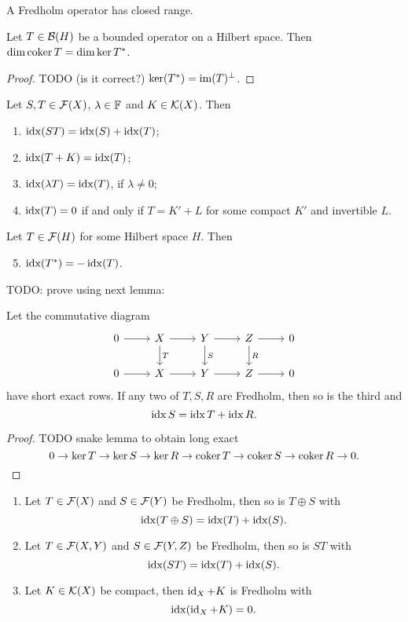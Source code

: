 \begin{lemma} \label{FredholmOperatorClosedRange}
A Fredholm operator has closed range.
\end{lemma}

\begin{lemma}
Let $T\in\operatorname{\mathcal{B}}(H)$ be a bounded operator on a Hilbert space. Then $\dim\operatorname{coker} T = \dim\ker T^*$.
\end{lemma}
\begin{proof}
TODO (is it correct?) $\ker(T^*) = \operatorname{im}(T)^\perp$.
\end{proof}


\begin{proposition}
Let $S,T\in\operatorname{\mathcal{F}}(X)$, $\lambda\in\mathbb{F}$ and $K\in\operatorname{\mathcal{K}}(X)$. Then
\begin{enumerate}
\item $\operatorname{idx}(ST) = \operatorname{idx}(S)+\operatorname{idx}(T)$;
\item $\operatorname{idx}(T+K) = \operatorname{idx}(T)$;
\item $\operatorname{idx}(\lambda T) = \operatorname{idx}(T)$, if $\lambda \neq 0$;
\item $\operatorname{idx}(T) = 0$ \textup{if and only if} $T=K'+L$ for some compact $K'$ and invertible $L$.
\end{enumerate}
Let $T\in\operatorname{\mathcal{F}}(H)$ for some Hilbert space $H$. Then
\begin{enumerate} \setcounter{enumi}{4}
\item $\operatorname{idx}(T^*) = -\operatorname{idx}(T)$.
\end{enumerate}
\end{proposition}
TODO: prove using next lemma:
\begin{lemma}
Let the commutative diagram
\[ \begin{tikzcd}
0 \rar & X \dar{T} \rar & Y \dar{S} \rar & Z \dar{R} \rar & 0 \\
0 \rar & X \rar & Y \rar & Z \rar & 0
\end{tikzcd} \]
have short exact rows. If any two of $T,S,R$ are Fredholm, then so is the third and
\[ \operatorname{idx} S = \operatorname{idx} T + \operatorname{idx} R. \]
\end{lemma}
\begin{proof}
TODO snake lemma to obtain long exact
\[ 0\to \ker T \to \ker S\to \ker R \to \operatorname{coker} T \to \operatorname{coker} S \to \operatorname{coker} R \to 0. \]
\end{proof}
\begin{corollary} \mbox{}
\begin{enumerate} 
\item Let $T\in\operatorname{\mathcal{F}}(X)$ and $S\in\operatorname{\mathcal{F}}(Y)$ be Fredholm, then so is $T\oplus S$ with
\[ \operatorname{idx}(T\oplus S) = \operatorname{idx}(T)+\operatorname{idx}(S). \]
\item Let $T\in\operatorname{\mathcal{F}}(X,Y)$ and $S\in\operatorname{\mathcal{F}}(Y,Z)$ be Fredholm, then so is $ST$ with
\[ \operatorname{idx}(ST) = \operatorname{idx}(T)+\operatorname{idx}(S). \]
\item Let $K\in\operatorname{\mathcal{K}}(X)$ be compact, then $\operatorname{id}_X+K$ is Fredholm with
\[ \operatorname{idx}(\operatorname{id}_X+K) = 0. \]
\end{enumerate}
\end{corollary}


